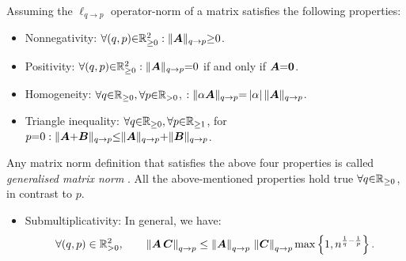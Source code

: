\begin{property}
\label{prp:OperatorProperties}
Assuming  the $\ell_{q {\to} p}$ operator-norm of a matrix satisfies the following properties:
\begin{itemize}
\item Nonnegativity: $\forall (q , p) {\in} \mathbb{R}^2_{{\geq} 0} : \Vert \boldsymbol{A} \Vert_{q {\to} p} {\geq} 0$.
\item Positivity: $\forall (q , p) {\in} \mathbb{R}^2_{{\geq} 0} : \Vert \boldsymbol{A} \Vert_{q {\to} p} {=} 0$ if and only if $\boldsymbol{A} {=} \boldsymbol{0}$.
\item Homogeneity: $\forall q {\in} \mathbb{R}_{{\geq} 0} , \forall p {\in} \mathbb{R}_{{>} 0}$,  $: \Vert \alpha \boldsymbol{A} \Vert_{q {\to} p} {=} \left\lvert\alpha\right\rvert \Vert \boldsymbol{A} \Vert_{q {\to} p}$.
\item Triangle inequality: $\forall q {\in} \mathbb{R}_{{\geq} 0} , \forall p {\in} \mathbb{R}_{{\geq} 1}$, for $p {=} 0 : \Vert \boldsymbol{A} {+} \boldsymbol{B} \Vert_{q {\to} p} {\leq} \Vert \boldsymbol{A} \Vert_{q {\to} p} {+} \Vert \boldsymbol{B} \Vert_{q {\to} p}$.
\end{itemize}
\begin{remark}
\label{rmrk:Generalized matrix norm} 
Any matrix norm definition that satisfies the above four properties is called \emph{generalised matrix norm} \cite{HornR.A.2012}.
All the above-mentioned properties hold true $\forall q {\in} \mathbb{R}_{{\geq} 0}$, in contrast to $p$.

\end{remark}
\begin{itemize}
\item Submultiplicativity: In general, we have:
\begin{gather*}
\forall (q , p) \in \mathbb{R}^2_{{>} 0}, \qquad \left\lVert\boldsymbol{A} \, \boldsymbol{C}\right\rVert_{q \to p} \leq \left\lVert\boldsymbol{A}\right\rVert_{q \to p} \, \left\lVert\boldsymbol{C}\right\rVert_{q \to p} \max \left\lbrace 1 , n^{\frac1q - \frac1p} \right\rbrace. 
\end{gather*}

\end{itemize}
\end{property}
